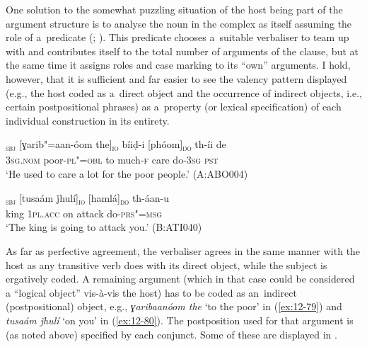 One solution to the somewhat puzzling situation of the host being part of the argument structure is to analyse the noun in the complex as itself assuming the role of a~predicate (\citealt[204--212]{verma1993}; \citealt[164--170]{mohanan1993}). This predicate chooses a~suitable verbaliser to team up with and contributes itself to the total number of arguments of the clause, but at the same time it assigns roles and case marking to its ``own'' arguments. I hold, however, that it is sufficient and far easier to see the valency pattern displayed (e.g., the host coded as a~direct object and the occurrence of indirect objects, i.e., certain postpositional phrases) as a~property (or lexical specification) of each individual construction in its entirety. 

\begin{exe}
\ex
\label{ex:12-79}
\gll [so]\textsubscript{\textsc{sbj}} [ɣarib"=aan-óom the]\textsubscript{\textsc{io}} bíiḍ-i [phóom]\textsubscript{\textsc{do}} th-íi de  \\
\textsc{3sg.nom} poor-\textsc{pl"=obl} to much-\textsc{f} care do-\textsc{3sg}  \textsc{pst} \\
\glt `He used to care a lot for the poor people.' (A:ABO004)
\end{exe}
\begin{exe}
\ex
\label{ex:12-80}
\gll [ṣuú]\textsubscript{\textsc{sbj}} [tusaám ǰhulí]\textsubscript{\textsc{io}} [hamlá]\textsubscript{\textsc{do}} th-áan-u  \\
king \textsc{1pl.acc} on attack do-\textsc{prs"=msg}  \\
\glt `The king is going to attack you.' (B:ATI040)
\end{exe}

As far as perfective agreement, the verbaliser agrees in the same manner with the host as any transitive verb does with its direct object, while the subject is ergatively coded. A remaining argument (which in that case could be considered a ``logical object'' vis-à-vis the host) has to be coded as an~indirect (postpositional) object, e.g., \textit{ɣaribaanóom the} `to the poor' in (\ref{ex:12-79}) and \textit{tusaám ǰhulí} `on you' in (\ref{ex:12-80}). The postposition used for that argument is (as noted above) specified by each conjunct. Some of these are displayed in .


